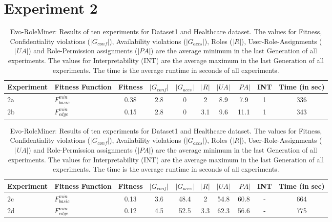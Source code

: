\section{Experiment 2}
\label{sec:A_Exp2}
	\begin{table}
		\centering
		\caption{Evo-RoleMiner: Results of ten experiments for Dataset1 and Healthcare dataset. The values for Fitness, Confidentiality violations ($|G_{conf}|$), Availability violations ($|G_{accs}|$), Roles ($|R|$), User-Role-Assignments ($|UA|$) and Role-Permission assignments ($|PA|$) are the average minimum in the last Generation of all experiments. The values for Interpretability (INT) are the average maximum in the last Generation of all experiments. The time is the average runtime in seconds of all experiments.}
		\label{tab:exp2_results}
		\begin{adjustbox}{width=\textwidth}
			\begin{tabular}{|l|l|c|c|c|c|c|c|c|c|}
				\hline
				\rowcolor{myGray} 
				\textbf{Experiment} & \textbf{Fitness Function} & \textbf{Fitness} & \textbf{$|G_{conf}|$} & \textbf{$|G_{accs}|$} & \textbf{$|R|$} & \textbf{$|UA|$} & \textbf{$|PA|$} & \textbf{INT} & \textbf{Time (in sec)}\\ \hline
				2a & $F_{basic}^{min}$ &   0.38   &   2.8   &   0   &   2   &   8.9   &   7.9   &  1   &   336\\ \hline
				2b & $F_{edge}^{min}$ &    0.15    &   2.8   &   0   &   3.1   &   9.6   &   11.1   &   1   &   343\\ \hline 
			\end{tabular}
		\end{adjustbox}
		\bigskip
		\begin{adjustbox}{width=\textwidth}
			\begin{tabular}{|l|l|c|c|c|c|c|c|c|c|}
				\hline
				\rowcolor{myGray} 
				\textbf{Experiment} & \textbf{Fitness Function} & \textbf{Fitness} & \textbf{$|G_{conf}|$} & \textbf{$|G_{accs}|$} & \textbf{$|R|$} & \textbf{$|UA|$} & \textbf{$|PA|$} & \textbf{INT} & \textbf{Time (in sec)}\\ \hline
				2c & $F_{basic}^{min}$ &   0.13   &   3.6   &   48.4   &   2   &   54.8   &   60.8   &   -   & 664\\ \hline
				2d & $F_{edge}^{min}$ &   0.12   &   4.5   &   52.5   &   3.3   &   62.3   &   56.6   &   -   & 775\\ \hline
			\end{tabular}
		\end{adjustbox}
	\end{table}
